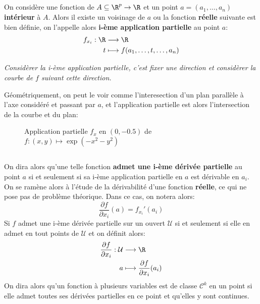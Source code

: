 \subsection*{}
On considère une fonction de \(A \subseteq \R^p \rightarrow \R\) et un point \(a = (a_1, \ldots, a_n)\) \textbf{intérieur} à \(A\). Alors il existe un voisinage de \(a\) ou la fonction \textbf{réelle} suivante est bien définie, on l'appelle alors \textbf{i-ème application partielle} au point \(a\):
\[
   \begin{aligned}
      f_{x_i} : \R &\longrightarrow \R\\
      t &\longmapsto f(a_1, \ldots, t, \ldots, a_n)
   \end{aligned}
\]
\begin{center}
   \textit{Considèrer la i-ème application partielle, c'est fixer une direction et considèrer la courbe de \(f\) suivant cette direction.}
\end{center}
Géométriquement, on peut le voir comme l'interesection d'un plan parallèle à l'axe considéré et passant par \(a\), et l'application partielle est alors l'intersection de la courbe et du plan:
\begin{figure}[h]
   \centering
   \captionsetup{labelformat=empty}
   \caption{Application partielle \(f_x\) en \((0, -0.5)\) de \(f : (x, y) \mapsto \exp(-x^2 - y^2)\)}
\end{figure}
\subsection*{}
On dira alors qu'une telle fonction \textbf{admet une i-ème dérivée partielle} au point \(a\) si et seulement si sa i-ème application partielle en \(a\) est dérivable en \(a_i\). On se ramène alors à l'étude de la dérivabilité d'une fonction \textbf{réelle}, ce qui ne pose pas de problème théorique. Dans ce cas, on notera alors:
\[
   \frac{\partial f}{\partial x_i}(a) = f_{x_i}'(a_i)   
\]
Si \(f\) admet une i-ème dérivée partielle sur un ouvert \(\mathcal{U}\) si et seulement si elle en admet en tout points de \(\mathcal{U}\) et on définit alors:
\[
   \begin{aligned}
      \frac{\partial f}{\partial x_i} : \mathcal{U} &\longrightarrow \R\\
      a &\longmapsto \frac{\partial f}{\partial x_i}(a_i)
   \end{aligned}
\]
On dira alors qu'un fonction à plusieurs variables est de classe \(\mathcal{C}^k\) en un point si elle admet toutes ses dérivées partielles en ce point et qu'elles y sont continues.
\pagebreak
